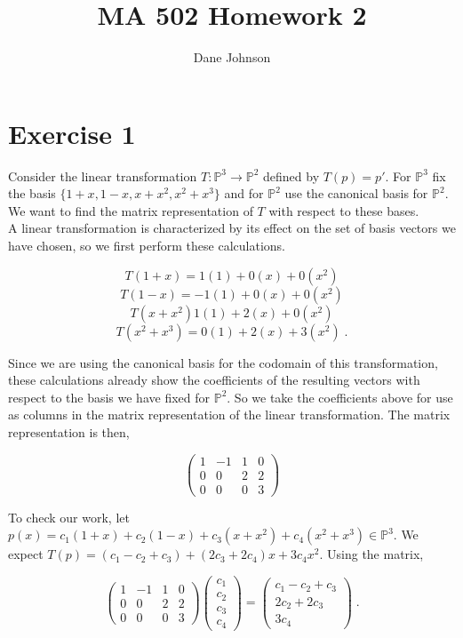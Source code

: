 \documentclass[11pt]{article}
\title{MA 502 Homework 2}
\author{Dane Johnson}
\begin{document}
\maketitle

\section*{Exercise 1}

Consider the linear transformation $T : \mathbb{P}^3 \rightarrow \mathbb{P}^2$ defined by $T(p) = p'$. For $\mathbb{P}^3$ fix the basis $\{1+x,1-x,x+x^2, x^2 + x^3\}$ and for $\mathbb{P}^2$ use the canonical basis for $\mathbb{P}^2$. We want to find the matrix representation of $T$ with respect to these bases. \\

A linear transformation is characterized by its effect on the set of basis vectors we have chosen, so we first perform these calculations.

$$T(1+x) = 1(1) + 0(x) + 0(x^2)$$
$$T(1-x) = -1(1) + 0(x) + 0(x^2)$$
$$T(x+x^2) 1(1) + 2(x) + 0(x^2)$$
$$T(x^2+x^3) = 0(1) + 2(x) + 3(x^2) \;.$$

Since we are using the canonical basis for the codomain of this transformation, these calculations already show the coefficients of the resulting vectors with respect to the basis we have fixed for $\mathbb{P}^2$. So we take the coefficients above for use as columns in the matrix representation of the linear transformation. The matrix representation is then,

$$\begin{pmatrix}
1&-1&1&0\\ 0&0&2&2\\ 0&0&0&3
\end{pmatrix}$$

To check our work, let $p(x) = c_1(1+x) + c_2(1-x) + c_3(x+x^2) + c_4(x^2+x^3) \in \mathbb{P}^3$. We expect $T(p) = (c_1 - c_2 +c_3) + (2c_3 + 2c_4)x + 3c_4x^2$. Using the matrix,

$$\begin{pmatrix}
1&-1&1&0\\ 0&0&2&2\\ 0&0&0&3
\end{pmatrix} \begin{pmatrix}
c_1 \\ c_2 \\ c_3 \\ c_4
\end{pmatrix} = \begin{pmatrix}
c_1-c_2+c_3 \\ 2c_2 +2c_3 \\ 3c_4
\end{pmatrix} \; . $$
\end{document}
